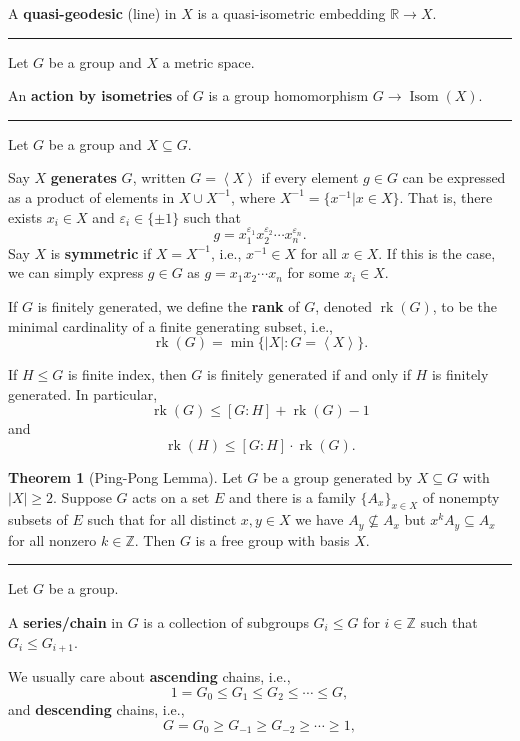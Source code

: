 \documentclass[12pt]{article}
\newcommand{\keyword}[1]{\textbf{#1}}
\newcommand{\sepline}{\rule{\textwidth}{0.4pt}}
\theoremstyle{definition}
\newtheorem{theorem}{Theorem}
\newcommand{\Z}{\mathbb{Z}}
\newcommand{\R}{\mathbb{R}}
\newcommand{\eps}{\varepsilon}
\newcommand{\<}{\left\langle}
\renewcommand{\>}{\right\rangle}
\newcommand{\seq}{\subseteq}
\DeclareMathOperator{\Isom}{Isom}
\DeclareMathOperator{\rk}{rk}
\begin{document}
A \keyword{quasi-geodesic} (line) in $X$ is a quasi-isometric embedding $\R \to X$.

\sepline

Let $G$ be a group and $X$ a metric space.

An \keyword{action by isometries} of $G$ is a group homomorphism $G \to \Isom(X)$.



\newpage
\sepline

Let $G$ be a group and $X \seq G$.

Say $X$ \keyword{generates} $G$, written $G = \<X\>$ if every element $g \in G$ can be expressed as a product of elements in $X \cup X^{-1}$, where $X^{-1} = \{x^{-1} | x \in X\}$.
That is, there exists $x_i \in X$ and $\eps_i \in \{\pm 1\}$ such that
\[
    g = x_1^{\eps_1} x_2^{\eps_2} \cdots x_n^{\eps_n}.
\]
Say $X$ is \keyword{symmetric} if $X = X^{-1}$, i.e., $x^{-1} \in X$ for all $x \in X$.
If this is the case, we can simply express $g \in G$ as $g = x_1x_2 \cdots x_n$ for some $x_i \in X$.

If $G$ is finitely generated, we define the \keyword{rank} of $G$, denoted $\rk(G)$, to be the minimal cardinality of a finite generating subset, i.e.,
\[
    \rk(G) = \min\{|X| : G = \<X\>\}.
\]

If $H \leq G$ is finite index, then $G$ is finitely generated if and only if $H$ is finitely generated.
In particular,
\[
    \rk(G) \leq [G : H] + \rk(G) - 1
\]
and
\[
    \rk(H) \leq [G : H] \cdot \rk(G).
\]



\begin{theorem}[Ping-Pong Lemma]
    Let $G$ be a group generated by $X \seq G$ with $|X| \geq 2$.
    Suppose $G$ acts on a set $E$ and there is a family $\{A_x\}_{x \in X}$ of nonempty subsets of $E$ such that for all distinct $x, y \in X$ we have $A_y \nsubseteq A_x$ but $x^kA_y \seq A_x$ for all nonzero $k \in \Z$.
    Then $G$ is a free group with basis $X$.
\end{theorem}


\sepline

Let $G$ be a group.

A \keyword{series/chain} in $G$ is a collection of subgroups $G_i \leq G$ for $i \in \Z$ such that $G_i \leq G_{i+1}$.

We usually care about \keyword{ascending} chains, i.e.,
\[
    1 = G_0 \leq G_1 \leq G_2 \leq \cdots \leq G,
\]
and \keyword{descending} chains, i.e.,
\[
    G = G_0 \geq G_{-1} \geq G_{-2} \geq \cdots \geq 1,
\]
\end{document}
